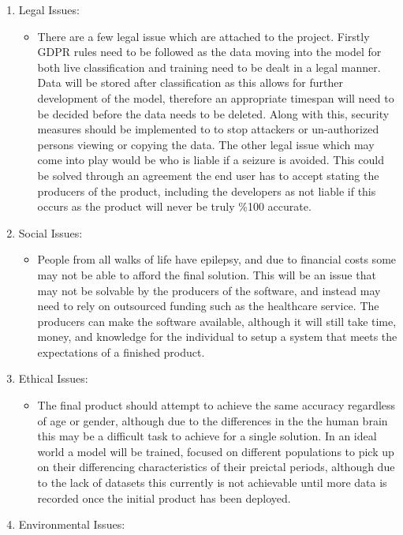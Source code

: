 \documentclass[12pt]{article}
\begin{document}
\begin{enumerate}
    \item Legal Issues:
    \begin{itemize}
        \item There are a few legal issue which are attached to the project. Firstly GDPR rules need to be followed as the data moving into the model for both live classification and training need to be dealt in a legal manner. Data will be stored after classification as this allows for further development of the model, therefore an appropriate timespan will need to be decided before the data needs to be deleted. Along with this, security measures should be implemented to to stop attackers or un-authorized persons viewing or copying the data. The other legal issue which may come into play would be who is liable if a seizure is avoided. This could be solved through an agreement the end user has to accept stating the producers of the product, including the developers as not liable if this occurs as the product will never be truly \%100 accurate.
    \end{itemize}
    \item Social Issues:
    \begin{itemize}
    	 \item People from all walks of life have epilepsy, and due to financial costs some may not be able to afford the final solution. This will be an issue that may not be solvable by the producers of the software, and instead may need to rely on outsourced funding such as the healthcare service. The producers can make the software available, although it will still take time, money, and knowledge for the individual to setup a system that meets the expectations of a finished product. 
    \end{itemize}
        \item Ethical Issues:
    \begin{itemize}
    	 \item The final product should attempt to achieve the same accuracy regardless of age or gender, although due to the differences in the the human brain this may be a difficult task to achieve for a single solution. In an ideal world a model will be trained, focused on different populations to pick up on their differencing characteristics of their preictal periods, although due to the lack of datasets this currently is not achievable until more data is recorded once the initial product has been deployed. 
    \end{itemize}
        \item Environmental Issues:

\end{enumerate}
\end{document}
